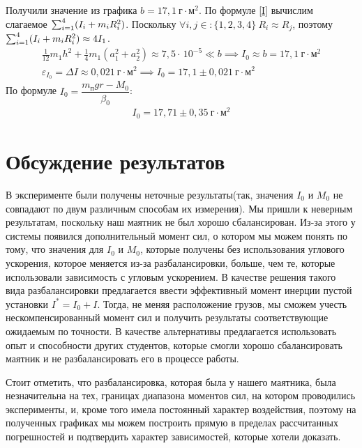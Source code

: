 \documentclass[a4paper,12pt]{article} %
\newcommand*{\hm}[1]{#1\nobreak\discretionary{}
	{\hbox{$\mathsurround=0pt #1$}}{}}
\begin{document}
Получили значение из графика $ b = 17,1 ~ \text{г} \cdot \text{м}^2  $. 
По формуле \eqref{I} вычислим слагаемое $ \sum_{i=1}^4(I_i\hm{+}m_iR_i^2) $. Поскольку $ \forall i, j \in: \{1, 2, 3, 4\}\ R_i \approx R_j $, поэтому $ \sum_{i=1}^4(I_i\hm{+}m_iR_i^2) \approx 4I_1 $. 
 \begin{gather}
    \frac{1}{12} m_1 h^2 + \frac{1}{4} m_1 (a_1^2 + a_2^2) \approx 7,5 \cdot\,10^{ - 5} \ll b \implies I_0 \approx b = 17,1~\text{г} \cdot \text{м}^2 \\
    \varepsilon_{I_0} = \Delta I \approx 0,021~ \text{г} \cdot \text{м}^2 \implies I_0 = 17,1\pm 0,021~\text{г} \cdot \text{м}^2\, 
\end{gather}
По формуле $I_0 = \dfrac{m_ \text{п}gr  - M_0}{\beta_0} $: \begin{gather}
    I_0 = 17,71 \pm 0,35 ~\text{г} \cdot \text{м}^2
\end{gather}  
\section{Обсуждение результатов}
В эксперименте были получены неточные результаты(так, значения $ I_0 $ и $ M_0 $ не совпадают по двум различным способам их измерения). Мы пришли к неверным результатам, поскольку
наш маятник не был хорошо сбалансирован. Из-за этого у системы появился дополнительный момент сил, о котором мы можем
понять по тому, что значения для $ I_0 $ и $ M_0 $, которые получены без использования углового ускорения, которое меняется из-за разбалансировки, больше, чем те, которые использовали зависимость с угловым ускорением.
В качестве решения такого вида разбалансировки предлагается ввести эффективный момент инерции пустой установки $ I^\ast = I_0 + I $. Тогда, не меняя расположение грузов, мы сможем учесть нескомпенсированный момент сил и получить результаты 
соответствующие ожидаемым по точности. В качестве альтернативы предлагается использовать опыт и способности других студентов, которые смогли хорошо сбалансировать маятник и не разбалансировать его в процессе работы.

Стоит отметить, что разбалансировка, которая была у нашего маятника, была незначительна на тех, границах диапазона моментов сил, на котором проводились эксперименты, и, кроме того имела постоянный характер воздействия,
поэтому на полученных графиках мы можем построить прямую в пределах рассчитанных погрешностей и подтвердить характер зависимостей, которые хотели доказать.
\end{document}
